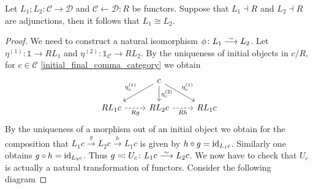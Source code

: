 \begin{prop}
    Let $L_1 ; L_2 \colon \mathcal{C} \to  \mathcal{D}$ and $\mathcal{C} \xleftarrow{}\mathcal{D}:R$ be functors.
    Suppose that $L_1 \dashv R$ and $L_2 \dashv R$ are adjunctions, then it follows that $L_1 \cong L_2$.
\end{prop}

\begin{proof}
    We need to construct a natural isomorphism $\phi \colon L_1 \isomorphism L_2$.
    Let $\eta^{(1)}\colon \mathds{1} \to RL_1$ and $\eta^{(2)} \colon \mathds{1}_{\mathcal{C}} \to RL_2$.
    By the uniqueness of initial objects in $c/R$, for $c \in \mathcal{C}$ \cref{initial_final_comma_category} we obtain 
    \[
    \begin{tikzcd}
        &
        c
        \arrow[ld, "\eta^{(1)}_c"']
        \arrow[d, "\eta^{(2)}_c"]
        \arrow[rd, "\eta^{(1)}_c"]
        &
        \\
        RL_1c
        \arrow[r, dashed, "Rg"']
        &
        RL_2c
        \arrow[r, dashed, "Rh"']
        &
        RL_1c
    \end{tikzcd}
    \]
    By the uniqueness of a morphism out of an initial object we obtain for the composition that 
    $L_1c \xrightarrow{g}L_2c \xrightarrow{h}L_1c$ 
    is given by $h \circ g = \operatorname{id}_{L_1c}$. 
    Similarly one obtains $g \circ h = \operatorname{id}_{L_2c}$.
    Thus $g \eqqcolon U_c \colon L_1c \isomorphism L_2c$.
    We now have to check that $U_c$ is actually a natural transformation of functors. Consider the following diagram
    

\end{proof}
